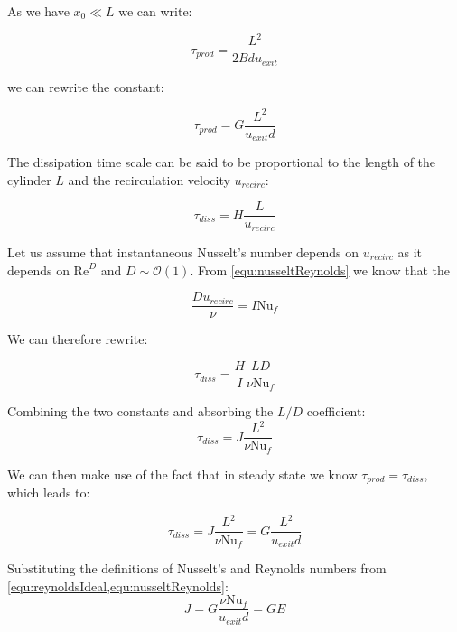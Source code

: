 \noindent As we have $x_0\ll L$ we can write:

\begin{equation}
\tau_{prod} = \frac{L^2}{2Bdu_{exit}}
\end{equation}

\noindent we can rewrite the constant:

\begin{equation}
\tau_{prod} = G \frac{L^2}{u_{exit} d}
\end{equation}

\noindent The dissipation time scale can be said to be proportional to the length of the cylinder $L$ and the recirculation velocity $u_{recirc}$: 

\begin{equation}
\tau_{diss} = H \frac{L}{u_{recirc}}
\end{equation}

\noindent Let us assume that instantaneous Nusselt's number depends on $u_{recirc}$ as it depends on $\text{Re}^D$ and $D\sim\mathcal{O}(1)$. From \cref{equ:nusseltReynolds} we know that the 

\begin{equation}
\frac{D u_{recirc}}{\nu} = I \text{Nu}_f
\end{equation}

\noindent We can therefore rewrite:

\begin{equation}
\tau_{diss} = \frac{H}{I} \frac{LD}{\nu \text{Nu}_f}
\end{equation}

\noindent Combining the two constants and absorbing the $L/D$ coefficient:
\begin{equation}
\tau_{diss} = J \frac{L^2}{\nu \text{Nu}_f}
\end{equation}

\noindent We can then make use of the fact that in steady state we know $\tau_{prod} = \tau_{diss}$, which leads to:

\begin{equation}
\tau_{diss} = J \frac{L^2}{\nu \text{Nu}_f} = G \frac{L^2}{u_{exit} d}
\end{equation}

\noindent  Substituting the definitions of Nusselt's and Reynolds numbers from \cref{equ:reynoldsIdeal,equ:nusseltReynolds}:
\begin{equation}
J = G \frac{\nu\text{Nu}_f}{u_{exit}d} = GE
\end{equation}

